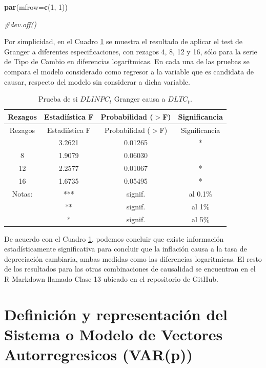 \documentclass[
]{book}
\newenvironment{Shaded}{\begin{snugshade}}{\end{snugshade}}
\newcommand{\AttributeTok}[1]{\textcolor[rgb]{0.13,0.29,0.53}{#1}}
\newcommand{\CommentTok}[1]{\textcolor[rgb]{0.56,0.35,0.01}{\textit{#1}}}
\newcommand{\DecValTok}[1]{\textcolor[rgb]{0.00,0.00,0.81}{#1}}
\newcommand{\FunctionTok}[1]{\textcolor[rgb]{0.13,0.29,0.53}{\textbf{#1}}}
\newcommand{\NormalTok}[1]{#1}
\begin{document}
\begin{Shaded}
\begin{Highlighting}[]
\FunctionTok{par}\NormalTok{(}\AttributeTok{mfrow=}\FunctionTok{c}\NormalTok{(}\DecValTok{1}\NormalTok{, }\DecValTok{1}\NormalTok{))}

\CommentTok{\#dev.off()}
\end{Highlighting}
\end{Shaded}

Por simplicidad, en el Cuadro \ref{tab:Granger} se muestra el resultado
de aplicar el test de Granger a diferentes especificaciones, con rezagos
4, 8, 12 y 16, sólo para la serie de Tipo de Cambio en diferencias
logarítmicas. En cada una de las pruebas se compara el modelo
considerado como regresor a la variable que es candidata de causar,
respecto del modelo sin considerar a dicha variable.

\begin{longtable}[]{@{}cccc@{}}
\caption{\label{tab:Granger} Prueba de si \(DLINPC_t\) Granger causa a \(DLTC_t\).}\tabularnewline
\toprule\noalign{}
Rezagos & Estadiística F & Probabilidad (\(>\)F) & Significancia \\
\midrule\noalign{}
\endfirsthead
\toprule\noalign{}
Rezagos & Estadiística F & Probabilidad (\(>\)F) & Significancia \\
\midrule\noalign{}
\endhead
\bottomrule\noalign{}
\endlastfoot
4 & 3.2621 & 0.01265 & * \\
8 & 1.9079 & 0.06030 & \\
12 & 2.2577 & 0.01067 & * \\
16 & 1.6735 & 0.05495 & * \\
Notas: & *** & signif. & al 0.1\% \\
& ** & signif. & al 1\% \\
& * & signif. & al 5\% \\
\end{longtable}

De acuerdo con el Cuadro \ref{tab:Granger}, podemos concluir que existe
información estadísticamente significativa para concluir que la
inflación causa a la tasa de depreciación cambiaria, ambas medidas como
las diferencias logaritmicas. El resto de los resultados para las otras
combinaciones de causalidad se encuentran en el R Markdown llamado Clase
13 ubicado en el repositorio de GitHub.

\hypertarget{definiciuxf3n-y-representaciuxf3n-del-sistema-o-modelo-de-vectores-autorregresicos-varp}{%
\section{Definición y representación del Sistema o Modelo de Vectores Autorregresicos (VAR(p))}\label{definiciuxf3n-y-representaciuxf3n-del-sistema-o-modelo-de-vectores-autorregresicos-varp}}
\end{document}
